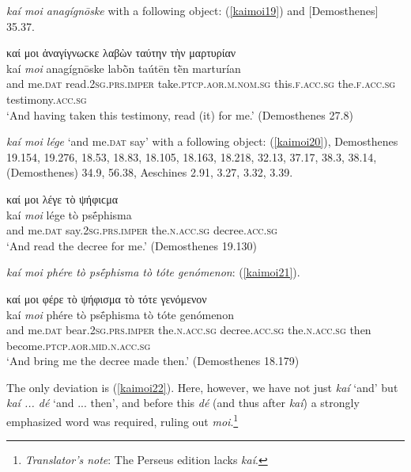 \textit{kaí moi anagígnōske} with a following object: (\ref{kaimoi19}) and {[}Demosthenes{]} 35.37.

\begin{exe}
\ex καί μοι ἀναγίγνωϲκε λαβὼν ταύτην τὴν μαρτυρίαν\\
\gll kaí \emph{moi} anagígnōske labṑn taútēn tḕn marturían\\
and me.\textsc{dat} read.\textsc{2sg.prs.imper}
take.\textsc{ptcp.aor.m.nom.sg} this.\textsc{f.acc.sg} the.\textsc{f.acc.sg} testimony.\textsc{acc.sg}\\
\trans `And having taken this testimony, read (it) for me.' (Demosthenes 27.8)
\label{kaimoi19}
\end{exe}

\textit{kaí moi lége} `and me.\textsc{dat} say' with a following object: (\ref{kaimoi20}), Demosthenes 19.154, 19.276, 18.53, 18.83, 18.105, 18.163, 18.218, 32.13, 37.17, 38.3, 38.14, (Demosthenes) 34.9, 56.38, Aeschines 2.91, 3.27, 3.32, 3.39.

\begin{exe}
\ex καί μοι λέγε τὸ ψήφιϲμα\\
\gll kaí \emph{moi} lége tò psḗphisma\\
and me.\textsc{dat} say.\textsc{2sg.prs.imper} the\textsc{.n.acc.sg} decree.\textsc{acc.sg}\\
\trans `And read the decree for me.' (Demosthenes 19.130)
\label{kaimoi20}
\end{exe}

\textit{kaí moi phére tò psḗphisma tò tóte genómenon}: (\ref{kaimoi21}).

\begin{exe}
\ex καί μοι φέρε τὸ ψήφισμα τὸ τότε γενόμενον\\
\gll kaí \emph{moi} phére tò psḗphisma tò tóte genómenon\\
and me.\textsc{dat} bear.\textsc{2sg.prs.imper} the.\textsc{n.acc.sg} decree.\textsc{acc.sg} the.\textsc{n.acc.sg} then become.\textsc{ptcp.aor.mid.n.acc.sg}\\
\trans `And bring me the decree made then.' (Demosthenes 18.179)
\label{kaimoi21}
\end{exe}

The only deviation is (\ref{kaimoi22}). Here, however, we have not just \textit{kaí} `and' but \textit{kaí ... dé} `and ... then', and before this \textit{dé} (and thus after \textit{kaí}) a strongly emphasized word was required, ruling out \textit{moi}.\footnote{\emph{Translator's note}: The Perseus edition lacks \textit{kaí}.}

